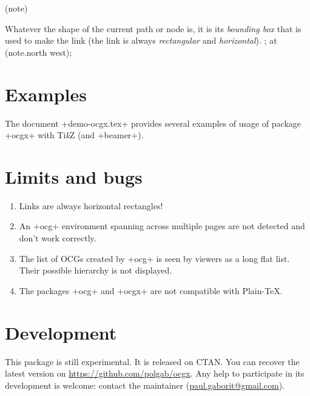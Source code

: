 \documentclass[a4paper]{ltxdoc}
\newcounter{mynotes}
\newenvironment{note}{%
  \tikzpicture
  \node[%
  rounded corners=1em,
  inner xsep=1.3em, inner ysep=.8em,
  text width=\linewidth-2.6em-\pgflinewidth,
  align=justify,
  draw=cyan!50!black,
  fill=white,
  fill=yellow!20,
  line width=1pt,
  drop shadow={fill=cyan!50!black},
  ] (note) \bgroup%
}{%
  \egroup;
  \node[circle,overlay,
  draw=white,fill=cyan!50!black,text=white,
  line width=2pt,
  drop shadow={fill=cyan!50!black},
  font=\small\bfseries,inner sep=4pt]
  at (note.north west){\stepcounter{mynotes}\arabic{mynotes}};
  \endtikzpicture\par\vspace{.1em}%
}
\newcommand\TikZ{Ti\emph{k}Z}
\begin{document}
\begin{note}
  Whatever the shape of the current path or node is, it is its
  \emph{bounding box} that is used to make the link (the link is always
  \emph{rectangular} and \emph{horizontal}).
\end{note}

\section{Examples}

The document \code+demo-ocgx.tex+ provides several examples of usage of
package \code+ocgx+ with \TikZ{} (and \code+beamer+).

\section{Limits and bugs}

\begin{enumerate}
\item Links are always horizontal rectangles!
\item An \code+ocg+ environment spanning across multiple pages are not
  detected and don't work correctly.
\item The list of OCGs created by \code+ocg+ is seen by viewers as a
  long flat list. Their possible hierarchy is not displayed.
\item The packages \code+ocg+ and \code+ocgx+ are not compatible with Plain-\TeX{}.
\end{enumerate}

\section{Development}
This package is still experimental. It is released on CTAN. You can
recover the latest version on \url{https://github.com/polgab/ocgx}. Any
help to participate in its development is welcome: contact the
maintainer (\url{paul.gaborit@gmail.com}).
\end{document}

